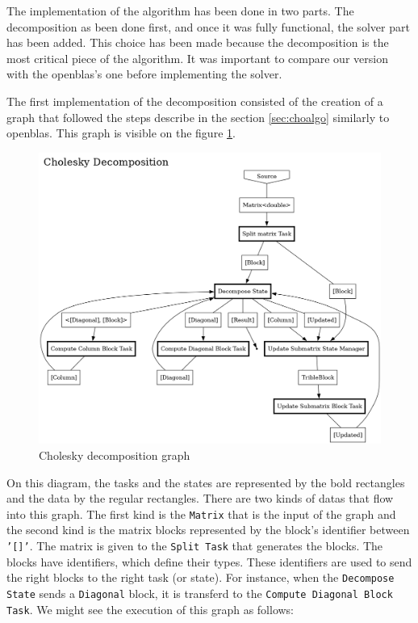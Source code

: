 The implementation of the algorithm has been done in two parts. The
decomposition as been done first, and once it was fully functional, the solver
part has been added. This choice has been made because the decomposition is the
most critical piece of the algorithm. It was important to compare our version
with the openblas's one before implementing the solver.

The first implementation of the decomposition consisted of the creation of a
graph that followed the steps describe in the section \ref{sec:choalgo}
similarly to openblas. This graph is visible on the figure \ref{fig:chograph}.

\begin{figure}[!ht]
  \begin{center}
    \includegraphics[scale=0.3]{img/cho-img/decompose_graph.png}
    \caption{Cholesky decomposition graph}
    \label{fig:chograph}
  \end{center}
\end{figure}

On this diagram, the tasks and the states are represented by the bold rectangles
and the data by the regular rectangles. There are two kinds of datas that flow
into this graph. The first kind is the \texttt{Matrix} that is the input of the
graph and the second kind is the matrix blocks represented by the block's
identifier between \texttt{'[]'}. The matrix is given to the \texttt{Split Task}
that generates the blocks. The blocks have identifiers, which define their
types. These identifiers are used to send the right blocks to the right task (or
state). For instance, when the \texttt{Decompose State} sends a
\texttt{Diagonal} block, it is transferd to the \texttt{Compute Diagonal Block
Task}. We might see the execution of this graph as follows:

